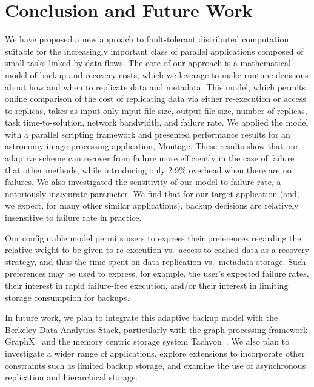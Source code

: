 \documentclass{sig-alternate}
\begin{document}
\section{Conclusion and Future Work}
\label{sec:Con}
We have proposed a new approach to fault-tolerant distributed computation suitable for the increasingly important class of parallel applications composed of small tasks linked by data flows.
The core of our approach is a mathematical model of backup and recovery costs, which we leverage to make runtime decisions about how and when to replicate data and metadata. This model, which permits online comparison of the cost of replicating data via either re-execution or access to replicas, takes as input only input file size, output file size, number of replicas, task time-to-solution, network bandwidth, and failure rate.
We applied the model with a parallel scripting framework and presented performance results for an astronomy image processing application, Montage.
These results show that our adaptive scheme can recover from failure more efficiently in the case of failure that other methods, while introducing only 2.9\% overhead when there are no failures. We also investigated the sensitivity of our model to failure rate, a notoriously inaccurate parameter. We find that for our target application (and, we expect, for many other similar applications), backup decisions are relatively insensitive to failure rate in practice.

Our configurable model permits users to express their preferences regarding the relative weight to be given to re-execution vs.\ access to cached data as a recovery strategy,
and thus the time spent on data replication vs.\ metadata storage. Such preferences may be used to express, for example, the user's expected failure rates, their interest
in rapid failure-free execution, and/or their interest in limiting storage consumption for backups.

In future work, we plan to integrate this adaptive backup model with the Berkeley Data Analytics Stack, particularly with
the graph processing framework GraphX~\cite{graphx2014} and the memory centric storage system Tachyon~\cite{tachyon2014}.
We also plan to investigate a wider range of applications, explore extensions to incorporate other constraints such as limited backup storage,
and examine the use of asynchronous replication and hierarchical storage.





\end{document}
